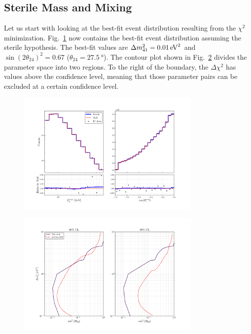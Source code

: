 \subsection{Sterile Mass and Mixing}
Let us start with looking at the best-fit event distribution resulting from the $\chi^2$ minimization.
Fig.~\ref{fig:final_rate_plot} now contains the best-fit event distribution assuming the sterile hypothesis.
The best-fit values are $\dm[41] = \SI{0.01}{\eV\squared}$ and 
$\sin(2\theta_{24})^2 = 0.67$ ($\theta_{24} = \SI{27.5}{\degree}$). %
The contour plot shown in Fig.~\ref{fig:s24_contour} divides the parameter space into two regions.
To the right of the boundary, the $\Delta \chi^2$ has values above the confidence level, meaning that 
those parameter pairs can be excluded at a certain confidence level.
\begin{figure}
    \centering
    \includegraphics[width=0.8\textwidth]{figures/final_rate_plot.pdf}
    \caption{}\label{fig:final_rate_plot}%
\end{figure}

\begin{figure}
    \centering
    \includegraphics[width=0.8\textwidth]{figures/s24_contour.pdf}
    \caption{}\label{fig:s24_contour}%
\end{figure}
%